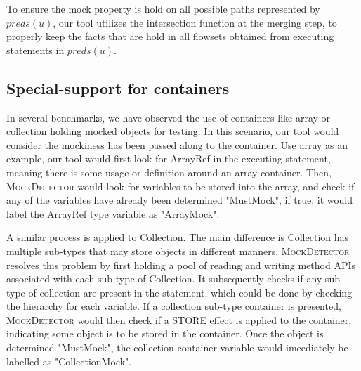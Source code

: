 To ensure the mock property is hold on all possible paths represented by $preds(u)$, our tool utilizes the intersection function at the merging step, to properly keep the facts that are hold in all flowsets obtained from executing statements in $preds(u)$.

\subsection{Special-support for containers}
\label{subsec:container}

In several benchmarks, we have observed the use of containers like array or collection holding mocked objects for testing. In this scenario, our tool would consider the mockiness has been passed along to the container. Use array as an example, our tool would first look for ArrayRef in the executing statement, meaning there is some usage or definition around an array container. Then, \textsc{MockDetector} would look for variables to be stored into the array, and check if any of the variables have already been determined "MustMock", if true, it would label the ArrayRef type variable as "ArrayMock".

A similar process is applied to Collection. The main difference is Collection has multiple sub-types that may store objects in different manners. \textsc{MockDetector} resolves this problem by first holding a pool of reading and writing method APIs associated with each sub-type of Collection. It subsequently checks if any sub-type of collection are present in the statement, which could be done by checking the hierarchy for each variable. If a collection sub-type container is presented, \textsc{MockDetector} would then check if a STORE effect is applied to the container, indicating some object is to be stored in the container. Once the object is determined "MustMock", the collection container variable would imeediately be labelled as "CollectionMock".